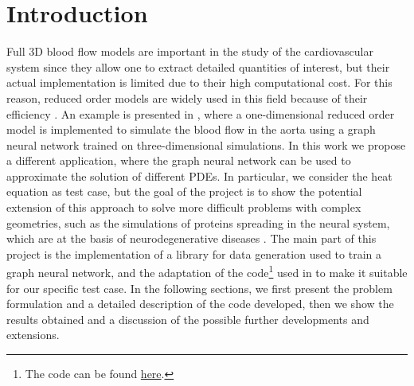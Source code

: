 \documentclass[11pt,a4paper]{article}
\begin{document}




\section{Introduction}
Full 3D blood flow models are important in the study of the cardiovascular system since they allow one to extract detailed quantities of interest, but their actual implementation is limited due to their high computational cost. For this reason, reduced order models are widely used in this field because of their efficiency \cite{Formaggia_Quarteroni_Veneziani_2009}. An example is presented in \cite{Luca}, where a one-dimensional reduced order model is implemented to simulate the blood flow in the aorta using a graph neural network trained on three-dimensional simulations. In this work we propose a different application, where the graph neural network can be used to approximate the solution of different PDEs. In particular, we consider the heat equation as test case, but the goal of the project is to show the potential extension of this approach to solve more difficult problems with complex geometries, such as the simulations of proteins spreading in the neural system, which are at the basis of neurodegenerative diseases \cite{MattiaCorti}. The main part of this project is the implementation of a library for data generation used to train a graph neural network, and the adaptation of the code\footnote{The code can be found \href{https://github.com/StanfordCBCL/gROM}{here}.} used in \cite{Luca} to make it suitable for our specific test case. In the following sections, we first present the problem formulation and a detailed description of the code developed, then we show the results obtained and a discussion of the possible further developments and extensions.

\end{document}
